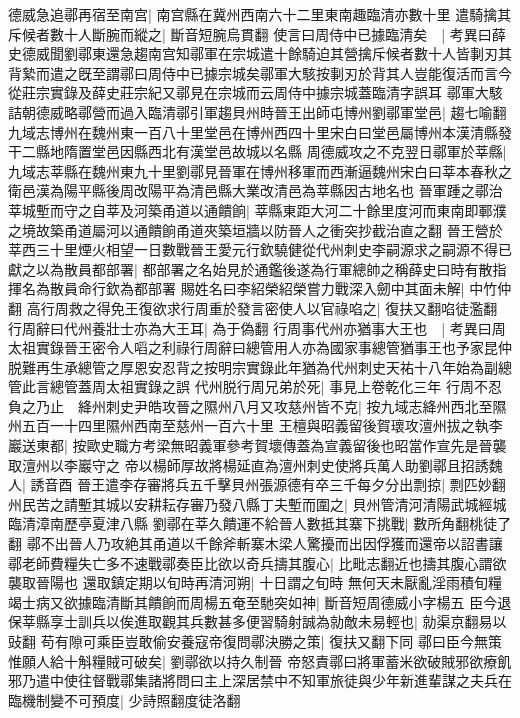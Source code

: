 德威急追鄩再宿至南宫|{
	南宫縣在冀州西南六十二里東南趣臨清亦數十里}
遣騎擒其斥候者數十人斷腕而縱之|{
	斷音短腕烏貫翻}
使言曰周侍中已據臨清矣　|{
	考異曰薛史德威聞劉鄩東還急趨南宫知鄩軍在宗城遣十餘騎迫其營擒斥候者數十人皆剚刃其背縶而遣之旣至謂鄩曰周侍中已據宗城矣鄩軍大駭按剚刃於背其人豈能復活而言今從莊宗實錄及薛史莊宗紀又鄩見在宗城而云周侍中據宗城蓋臨清字誤耳}
鄩軍大駭詰朝德威略鄩營而過入臨清鄩引軍趨貝州時晉王出師屯博州劉鄩軍堂邑|{
	趨七喻翻九域志博州在魏州東一百八十里堂邑在博州西四十里宋白曰堂邑屬博州本漢清縣發干二縣地隋置堂邑因縣西北有漢堂邑故城以名縣}
周德威攻之不克翌日鄩軍於莘縣|{
	九域志莘縣在魏州東九十里劉鄩見晉軍在博州移軍而西漸逼魏州宋白曰莘本春秋之衛邑漢為陽平縣後周改陽平為清邑縣大業改清邑為莘縣因古地名也}
晉軍踵之鄩治莘城塹而守之自莘及河築甬道以通饋餉|{
	莘縣東距大河二十餘里度河而東南即鄆濮之境故築甬道屬河以通饋餉甬道夾築垣牆以防晉人之衝突抄截治直之翻}
晉王營於莘西三十里煙火相望一日數戰晉王愛元行欽驍健從代州刺史李嗣源求之嗣源不得已獻之以為散員都部署|{
	都部署之名始見於通鑑後遂為行軍總帥之稱薛史曰時有散指揮名為散員命行欽為都部署}
賜姓名曰李紹榮紹榮嘗力戰深入劒中其面未解|{
	中竹仲翻}
高行周救之得免王復欲求行周重於發言密使人以官祿啗之|{
	復扶又翻啗徒濫翻}
行周辭曰代州養壯士亦為大王耳|{
	為于偽翻}
行周事代州亦猶事大王也　|{
	考異曰周太祖實錄晉王密令人㗖之利祿行周辭曰總管用人亦為國家事總管猶事王也予家昆仲脱難再生承總管之厚恩安忍背之按明宗實錄此年猶為代州刺史天祐十八年始為副總管此言總管蓋周太祖實錄之誤}
代州脱行周兄弟於死|{
	事見上卷乾化三年}
行周不忍負之乃止　絳州刺史尹皓攻晉之隰州八月又攻慈州皆不克|{
	按九域志絳州西北至隰州五百一十四里隰州西南至慈州一百六十里}
王檀與昭義留後賀瓌攻澶州拔之執李巖送東都|{
	按歐史職方考梁無昭義軍參考賀壞傳蓋為宣義留後也昭當作宣先是晉襲取澶州以李巖守之}
帝以楊師厚故將楊延直為澶州刺史使將兵萬人助劉鄩且招誘魏人|{
	誘音酉}
晉王遣李存審將兵五千擊貝州張源德有卒三千每夕分出剽掠|{
	剽匹妙翻}
州民苦之請塹其城以安耕耘存審乃發八縣丁夫塹而圍之|{
	貝州管清河清陽武城經城臨清漳南歷亭夏津八縣}
劉鄩在莘久饋運不給晉人數抵其寨下挑戰|{
	數所角翻桃徒了翻}
鄩不出晉人乃攻絶其甬道以千餘斧斬寨木梁人驚擾而出因俘獲而還帝以詔書讓鄩老師費糧失亡多不速戰鄩奏臣比欲以奇兵擣其腹心|{
	比毗志翻近也擣其腹心謂欲襲取晉陽也}
還取鎮定期以旬時再清河朔|{
	十日謂之旬時}
無何天未厭亂淫雨積旬糧竭士病又欲據臨清斷其饋餉而周楊五奄至馳突如神|{
	斷音短周德威小字楊五}
臣今退保莘縣享士訓兵以俟進取觀其兵數甚多便習騎射誠為勍敵未易輕也|{
	勍渠京翻易以䜴翻}
苟有隙可乘臣豈敢偷安養寇帝復問鄩決勝之策|{
	復扶又翻下同}
鄩曰臣今無策惟願人給十斛糧賊可破矣|{
	劉鄩欲以持久制晉}
帝怒責鄩曰將軍蓄米欲破賊邪欲療飢邪乃遣中使往督戰鄩集諸將問曰主上深居禁中不知軍旅徒與少年新進輩謀之夫兵在臨機制變不可預度|{
	少詩照翻度徒洛翻}

